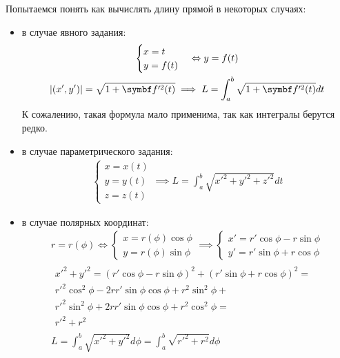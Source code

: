 \documentclass[main]{subfiles}
\begin{document}
Попытаемся понять как вычислять длину прямой в некоторых случаях:
\begin{itemize}
    \item в случае явного задания:
          \begin{gather*}
              \displaystyle \begin{cases}
                  x = t \\
                  y = f(t)
              \end{cases} \Leftrightarrow y = f(t) \\
              |(x',y')|  = \sqrt{1 + \vf'^2(t)} \implies
              L = \int_a^b\sqrt{1 + \vf'^2(t)} dt
          \end{gather*}
          К сожалению, такая формула мало применима, так как интегралы берутся редко.
    \item в случае параметрического задания:
          \begin{gather*}\begin{cases}
                  x = x(t) \\
                  y = y(t) \\
                  z = z(t)
              \end{cases} \implies
              L = \int_a^b \sqrt{x'^2 + y'^2 +z'^2} dt
          \end{gather*}
    \item в случае полярных координат:
          \begin{gather*}
              r = r(\phi) \Leftrightarrow \begin{cases}
                  x = r(\phi) \cos \phi \\
                  y = r(\phi) \sin \phi
              \end{cases} \implies
              \begin{cases}
                  x' = r' \cos \phi -r \sin \phi \\
                  y' = r' \sin \phi + r \cos \phi
              \end{cases} \\
              \begin{multlined}
                  x'^2 + y'^2 = (r' \cos \phi -r \sin \phi)^2 + (r' \sin \phi + r \cos \phi)^2 = \\
                  r'^2\cos^2 \phi - 2rr'\sin \phi \cos \phi + r^2 \sin^2 \phi +\\
                  r'^2 \sin^2\phi + 2rr' \sin \phi \cos \phi + r^2 \cos^2 \phi = \\
                  r'^2 + r^2
              \end{multlined}\\
              L = \int_a^b \sqrt{x'^2 + y'^2} d\phi  = \int_a^b \sqrt{r'^2 + r^2}d \phi
          \end{gather*}
\end{itemize}
\end{document}
